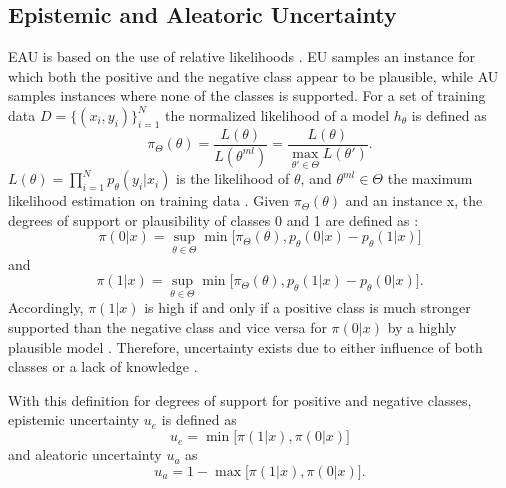 \subsection{Epistemic and Aleatoric Uncertainty}
\label{subsec:epistemic_and_alreatoric_uncertainty}
%
\Ac{EAU} is based on the use of relative likelihoods \cite{nguyen2021howtomeasure}. 
\Ac{EU} samples an instance for which both the positive and the negative class appear to be plausible, while \ac{AU} samples instances where none of the classes is supported.
For a set of training data $D = \{(x_i, y_i)\}_{i=1}^{N}$ the normalized likelihood of a model $h_{\theta}$ is defined as
\begin{equation}
\pi_{\Theta}(\theta) = \frac{L(\theta)}{L(\theta^{ml})} = \frac{L(\theta)}{\max_{\theta'\in \Theta}{L(\theta')}}.
\end{equation} 
$L(\theta) = \prod_{i=1}^{N}{p_{\theta}(y_i | x_i)} $ is the likelihood of $\theta$, and $\theta^{ml} \in \Theta$ the maximum likelihood estimation on training data \cite{nguyen2021howtomeasure}.
Given $\pi_{\Theta}(\theta)$ and an instance x, the degrees of support or plausibility of  classes 0 and 1 are defined as \cite{nguyen2021howtomeasure}:
\begin{equation}
\pi(0 | x) = \sup_{\theta \in \Theta} \min \bigg[ \pi_{\Theta}(\theta), p_{\theta}(0 | x) - p_{\theta}(1 | x)\bigg]
\end{equation} 
and
\begin{equation}
\pi(1 | x) = \sup_{\theta \in \Theta} \min \bigg[ \pi_{\Theta}(\theta), p_{\theta}(1 | x) - p_{\theta}(0 | x)\bigg].
\end{equation} 
Accordingly, $\pi(1 | x)$ is high if and only if a positive class is much stronger supported than the negative class and vice versa for $\pi(0 | x)$ by a highly plausible model  \cite{nguyen2021howtomeasure}.
Therefore, uncertainty exists due to either influence of both classes or a lack of knowledge \cite{nguyen2021howtomeasure}. 

With this definition for degrees of support for positive and negative classes, epistemic uncertainty $u_e$ is defined as \cite{nguyen2021howtomeasure}
\begin{equation}
u_e = \min \bigg[ \pi(1 | x), \pi(0 | x) \bigg]
\end{equation}
and aleatoric uncertainty $u_a$ as
\begin{equation}
u_a = 1 - \max \bigg[ \pi(1 | x), \pi(0 | x) \bigg].
\end{equation}

